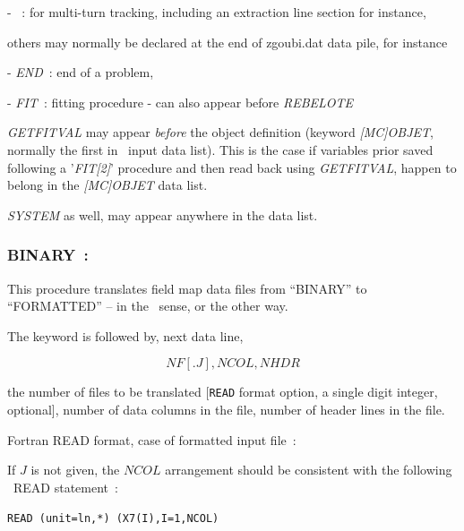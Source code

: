 - \REBELOTE{}~: for    multi-turn tracking, 
including  an extraction line section for instance, 

\medskip

\noindent others may  normally be declared at the end of zgoubi.dat  data pile, for instance

- \textsl{END}~:  end of a problem, 

- \textsl{FIT}~: fitting procedure - can also appear before \textsl{REBELOTE}


\medskip

\noindent \textsl{GETFITVAL} may appear 
\textsl{before} the object definition (keyword \textsl{[MC]OBJET}, normally the first in \zgou\ input data list). This is 
the case if  variables prior saved following a '\textsl{FIT[2]}' procedure 
and then read back using \textsl{GETFITVAL}, happen to belong in the \textsl{[MC]OBJET} data list. 

\medskip

\noindent \textsl{SYSTEM} as well,  may appear anywhere in the data list.



\newpage

\subsubsection*{BINARY~: \BINARYTitl}  \label{BINARY} 
\medskip

This procedure translates field map data files from ``BINARY'' to 
``FORMATTED'' -- in the \FORTRAN\ sense, or the other way.

\bigskip

\noindent The keyword is followed by, next data line,  

$$NF[.J], NCOL, NHDR $$

\noindent  the number of files to be translated [\texttt{READ} format option, a single digit integer, optional],  
number of data columns in the file, 
number of header lines in the file.  

\bigskip

\noindent Fortran READ format, case of formatted input file~: 

\smallskip

 If $J$ is not given, the $NCOL$ arrangement should be consistent with the following \FORTRAN\ READ statement~: 

       {\tt     READ (unit=ln,*) (X7(I),I=1,NCOL)}

